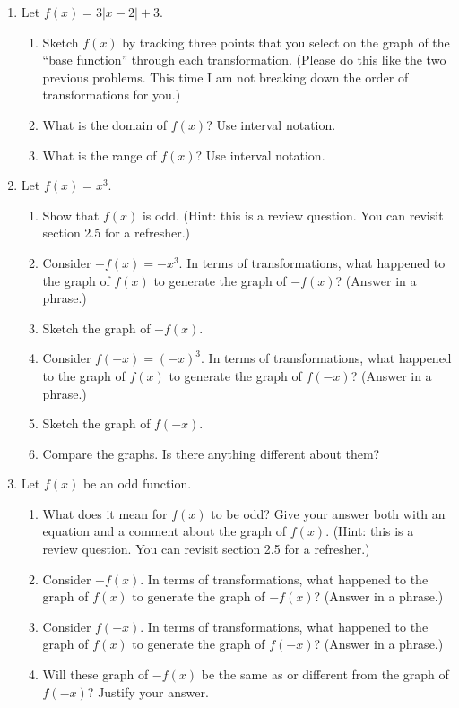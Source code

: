 \documentclass[12pt]{amsart}
\begin{document}
\begin{enumerate}
\item Let $f(x)= 3|x-2|+3$.  
\begin{enumerate}
\item Sketch $f(x)$ by tracking three points that you select on the graph of the ``base function'' through each transformation.  (Please do this like the two previous problems.  This time I am not breaking down the order of transformations for you.)
\item What is the domain of $f(x)$?  Use interval notation.
\item What is the range of $f(x)$?  Use interval notation.
\end{enumerate}


\item Let $f(x)=x^3$.
\begin{enumerate}
\item Show that $f(x)$ is odd.  (Hint: this is a review question.  You can revisit section 2.5 for a refresher.)
\item Consider $-f(x) = -x^3$.  In terms of transformations, what happened to the graph of $f(x)$ to generate the graph of $-f(x)$? (Answer in a phrase.)
\item Sketch the graph of $-f(x)$.
\item Consider $f(-x)=(-x)^3$.  In terms of transformations, what happened to the graph of $f(x)$ to generate the graph of $f(-x)$? (Answer in a phrase.)
\item Sketch the graph of $f(-x)$.
\item Compare the graphs.  Is there anything different about them?
\end{enumerate}





\item Let $f(x)$ be an odd function.
\begin{enumerate}
\item What does it mean for $f(x)$ to be odd?  Give your answer both with an equation and a comment about the graph of $f(x)$.  (Hint: this is a review question.  You can revisit section 2.5 for a refresher.)
\item Consider $-f(x)$.  In terms of transformations, what happened to the graph of $f(x)$ to generate the graph of $-f(x)$? (Answer in a phrase.)
\item Consider $f(-x)$.  In terms of transformations, what happened to the graph of $f(x)$ to generate the graph of $f(-x)$? (Answer in a phrase.)
\item Will these graph of $-f(x)$ be the same as or different from the graph of $f(-x)$?  Justify your answer.
\end{enumerate}


\end{enumerate}
\end{document}
